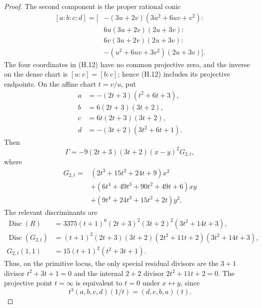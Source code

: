 \begin{proof}
The second component is the proper rational conic
\begin{equation}
\begin{aligned}
[a:b:c:d]=[&-(3u+2v)(3u^2+6uv+v^2):\\
&6u(3u+2v)(2u+3v):\\
&6v(3u+2v)(2u+3v):\\
&-(u^2+6uv+3v^2)(2u+3v)].
\end{aligned}
\tag{H.12}
\end{equation}
The four coordinates in (H.12) have no common projective zero, and the
inverse on the dense chart is \([u:v]=[b:c]\); hence (H.12) includes its
projective endpoints.  On the affine chart \(t=v/u\), put
\begin{equation}
\begin{aligned}
 a&=-(2t+3)(t^2+6t+3),\\
 b&=6(2t+3)(3t+2),\\
 c&=6t(2t+3)(3t+2),\\
 d&=-(3t+2)(3t^2+6t+1).
\end{aligned}
\tag{H.13}
\end{equation}
Then
\begin{equation}
 \Gamma=-9(2t+3)(3t+2)(x-y)^2G_{2,t},   \tag{H.14}
\end{equation}
where
\begin{equation}
\begin{aligned}
G_{2,t}={}&(2t^3+15t^2+24t+9)x^2\\
&+(6t^4+49t^3+90t^2+49t+6)xy\\
&+(9t^4+24t^3+15t^2+2t)y^2.
\end{aligned}
\tag{H.15}
\end{equation}
The relevant discriminants are
\begin{align}
 \operatorname{Disc}(R)
 &=3375(t+1)^6(2t+3)^2(3t+2)^2(3t^2+14t+3),
 \tag{H.16}\\
 \operatorname{Disc}(G_{2,t})
 &=(t+1)^2(2t+3)(3t+2)
   (2t^2+11t+2)(3t^2+14t+3),             \tag{H.17}\\
 G_{2,t}(1,1)
 &=15(t+1)^2(t^2+3t+1).                  \tag{H.18}
\end{align}
Thus, on the primitive locus, the only special residual divisors are the
\(3+1\) divisor \(t^2+3t+1=0\) and the internal \(2+2\) divisor
\(2t^2+11t+2=0\).  The projective point \(t=\infty\) is equivalent to
\(t=0\) under \(x\leftrightarrow y\), since
\[
 t^3(a,b,c,d)(1/t)=(d,c,b,a)(t).
\]


\end{proof}
